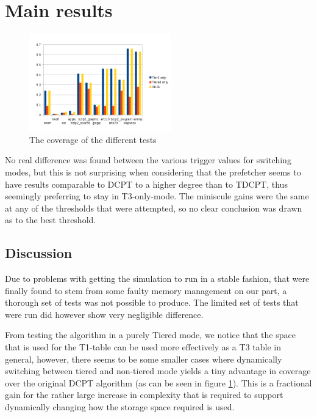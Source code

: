 \section{Main results}
\begin{figure}
\centering
\includegraphics[width=0.55\textwidth]{images/dmarkchart.png}
\caption{The coverage of the different tests}
\label{fig:chart}
\end{figure}
No real difference was found between the various trigger values for switching modes,
but this is not surprising when considering that the prefetcher seems to have results
comparable to DCPT to a higher degree than to TDCPT, thus seemingly preferring to stay
in T3-only-mode. The miniscule gains were the same at any of the thresholds that were
attempted, so no clear conclusion was drawn as to the best threshold.

\subsection{Discussion}
Due to problems with getting the simulation to run in a stable fashion, that
were finally found to stem from some faulty memory management on our part, a
thorough set of tests was not possible to produce. The limited set of tests
that were run did however show very negligible difference.

From testing the algorithm in a purely Tiered mode, we notice that the
space that is used for the T1-table can be used more effectively as a T3
table in general, however, there seems to be some smaller cases where dynamically
switching between tiered and non-tiered mode yields a tiny advantage in coverage
over the original DCPT algorithm (as can be seen in figure \ref{fig:chart}). 
This is a fractional gain for the rather
large increase in complexity that is required to support dynamically changing how
the storage space required is used.


